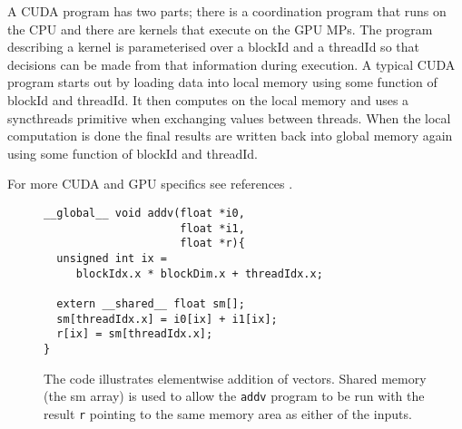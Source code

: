 A CUDA program has two parts; there is a coordination program that runs on the 
CPU and there are kernels that execute on the GPU MPs. The program describing 
a kernel is parameterised over a blockId and a threadId so that 
decisions can be made from that information during execution. A typical 
CUDA program starts out by loading data into local memory using some 
function of blockId and threadId. It then computes on the local memory 
and uses a syncthreads primitive when exchanging values between threads. 
When the local computation is done the final results are written back into 
global memory again using some function of blockId and threadId. 

For more CUDA and GPU specifics see references . 

\begin{figure}
\begin{small}
\begin{verbatim}
__global__ void addv(float *i0, 
                     float *i1, 
                     float *r){ 
  unsigned int ix = 
     blockIdx.x * blockDim.x + threadIdx.x;

  extern __shared__ float sm[]; 
  sm[threadIdx.x] = i0[ix] + i1[ix]; 
  r[ix] = sm[threadIdx.x];
} 
\end{verbatim}
\end{small}
\caption{The code illustrates elementwise addition of vectors. Shared memory 
(the sm array) is used to allow the {\tt addv} program to be run with the 
result {\tt r} pointing to the same memory area as either of the inputs.} 
\label{fig:cudaKernel1}
\end{figure}

